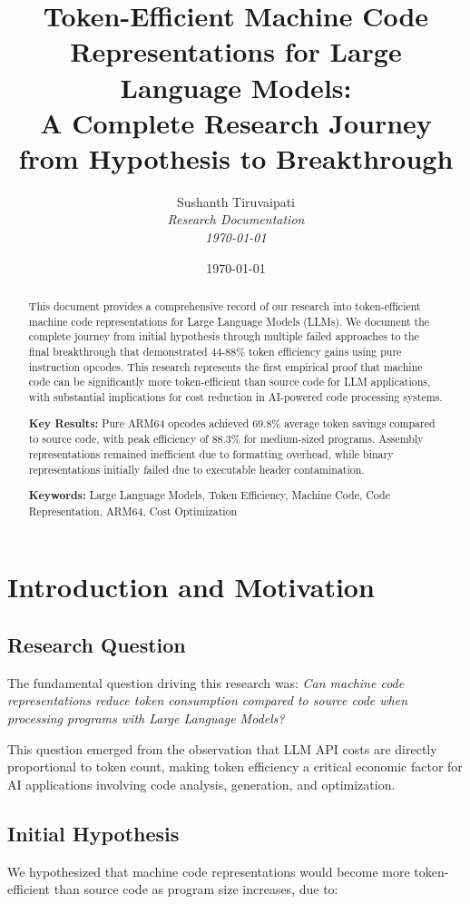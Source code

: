 \documentclass[11pt,a4paper]{article}
\title{\textbf{Token-Efficient Machine Code Representations for Large Language Models:\\
A Complete Research Journey from Hypothesis to Breakthrough}}
\author{Sushanth Tiruvaipati\\
\textit{Research Documentation}\\
\textit{\today}}
\date{\today}
\begin{document}
\maketitle

\begin{abstract}
This document provides a comprehensive record of our research into token-efficient machine code representations for Large Language Models (LLMs). We document the complete journey from initial hypothesis through multiple failed approaches to the final breakthrough that demonstrated 44-88\% token efficiency gains using pure instruction opcodes. This research represents the first empirical proof that machine code can be significantly more token-efficient than source code for LLM applications, with substantial implications for cost reduction in AI-powered code processing systems.

\textbf{Key Results:} Pure ARM64 opcodes achieved 69.8\% average token savings compared to source code, with peak efficiency of 88.3\% for medium-sized programs. Assembly representations remained inefficient due to formatting overhead, while binary representations initially failed due to executable header contamination.

\textbf{Keywords:} Large Language Models, Token Efficiency, Machine Code, Code Representation, ARM64, Cost Optimization
\end{abstract}

\tableofcontents
\newpage

\section{Introduction and Motivation}

\subsection{Research Question}
The fundamental question driving this research was: \textit{Can machine code representations reduce token consumption compared to source code when processing programs with Large Language Models?}

This question emerged from the observation that LLM API costs are directly proportional to token count, making token efficiency a critical economic factor for AI applications involving code analysis, generation, and optimization.

\subsection{Initial Hypothesis}
We hypothesized that machine code representations would become more token-efficient than source code as program size increases, due to:
\end{document}
